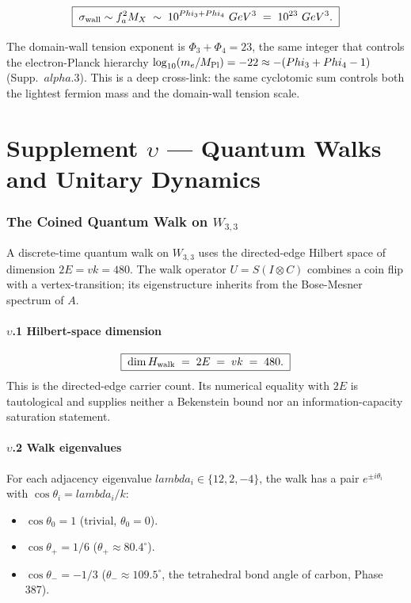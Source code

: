 \documentclass[12pt,a4paper]{article}
\def\mathcal#1{#1}%
\def\text#1{#1}%
\def\alpha{alpha}%
\def\lambda{lambda}%
\def\Phi#1{Phi#1}%
\def\cdot{ }%
\theoremstyle{definition}
\begin{document}
\[
\boxed{\;\sigma_{\rm wall} \sim f_a^2 \cdot M_X \;\sim\; 10^{\Phi_3 + \Phi_4}\ \text{GeV}^3 \;=\; 10^{23}\ \text{GeV}^3.\;}
\]

The domain-wall tension exponent is $\Phi_3+\Phi_4 = 23$, the same
integer that controls the electron-Planck hierarchy
$\log_{10}(m_e/M_{\rm Pl}) = -22 \approx -(Phi_3+\Phi_4-1)$
(Supp.~$\alpha$.3). This is a deep cross-link: the same cyclotomic
sum controls both the lightest fermion mass and the domain-wall
tension scale.

\clearpage
\part*{\texorpdfstring{Supplement $\upsilon$ --- Quantum Walks and Unitary Dynamics}{Supplement upsilon --- Quantum Walks and Unitary Dynamics}}

\section*{The Coined Quantum Walk on $W_{3,3}$}

A discrete-time quantum walk on $W_{3,3}$ uses the directed-edge
Hilbert space of dimension $2E = vk = 480$. The walk operator
$U = S(I\otimes C)$ combines a coin flip with a vertex-transition;
its eigenstructure inherits from the Bose-Mesner spectrum of $A$.

\subsection*{$\upsilon$.1 \quad Hilbert-space dimension}
\[
\boxed{\;\dim\mathcal{H}_{\rm walk} \;=\; 2E \;=\; vk \;=\; 480.\;}
\]
This is the directed-edge carrier count.  Its numerical equality with
$2E$ is tautological and supplies neither a Bekenstein bound nor an
information-capacity saturation statement.

\subsection*{$\upsilon$.2 \quad Walk eigenvalues}
For each adjacency eigenvalue $\lambda_i\in\{12,2,-4\}$, the walk has a pair $e^{\pm i\theta_i}$ with $\cos\theta_i = \lambda_i/k$:
\begin{itemize}[leftmargin=2em,nosep]
\item $\cos\theta_0 = 1$ (trivial, $\theta_0=0$).
\item $\cos\theta_+ = 1/6$ ($\theta_+\approx 80.4^\circ$).
\item $\cos\theta_- = -1/3$ ($\theta_-\approx 109.5^\circ$, the
tetrahedral bond angle of carbon, Phase 387).
\end{itemize}
\end{document}
